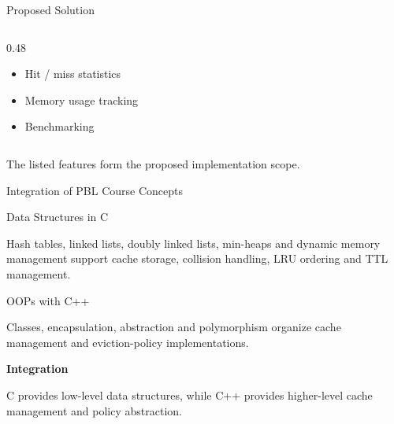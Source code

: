 \documentclass[aspectratio=169,10pt]{beamer}
\begin{document}
\begin{frame}{Proposed Solution}
\begin{columns}[T]
\begin{column}{0.48\textwidth}
\begin{itemize}
\item Hit / miss statistics

\item Memory usage tracking

\item Benchmarking

\end{itemize}

\end{column}

\end{columns}

\vfill

\small
\textcolor{GEUGrey}{
The listed features form the proposed implementation scope.
}

\end{frame}


\begin{frame}{Integration of PBL Course Concepts}

\begin{block}{Data Structures in C}

Hash tables, linked lists, doubly linked lists, min-heaps and
dynamic memory management support cache storage, collision
handling, LRU ordering and TTL management.

\end{block}

\vspace{3mm}

\begin{block}{OOPs with C++}

Classes, encapsulation, abstraction and polymorphism organize
cache management and eviction-policy implementations.

\end{block}

\vfill

\begin{center}

\colorbox{GEULightBlue}{
\parbox{0.82\textwidth}{
\centering

\textbf{\color{GEUBlue}Integration}

C provides low-level data structures, while C++ provides
higher-level cache management and policy abstraction.

}}

\end{center}

\end{frame}
\end{document}
